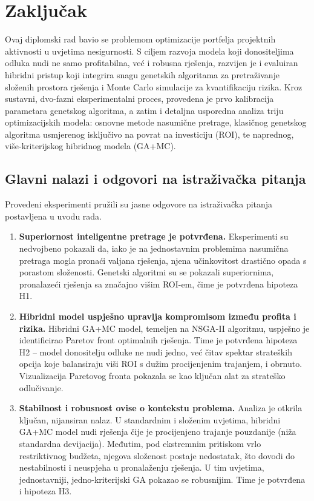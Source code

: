 \section{Zaključak}
Ovaj diplomski rad bavio se problemom optimizacije portfelja projektnih aktivnosti u uvjetima nesigurnosti. S ciljem razvoja modela koji donositeljima odluka nudi ne samo profitabilna, već i robusna rješenja, razvijen je i evaluiran hibridni pristup koji integrira snagu genetskih algoritama za pretraživanje složenih prostora rješenja i Monte Carlo simulacije za kvantifikaciju rizika.
Kroz sustavni, dvo-fazni eksperimentalni proces, provedena je prvo kalibracija parametara genetskog algoritma, a zatim i detaljna usporedna analiza triju optimizacijskih modela: osnovne metode nasumične pretrage, klasičnog genetskog algoritma usmjerenog isključivo na povrat na investiciju (ROI), te naprednog, više-kriterijskog hibridnog modela (GA+MC).

\subsection{Glavni nalazi i odgovori na istraživačka pitanja}
Provedeni eksperimenti pružili su jasne odgovore na istraživačka pitanja postavljena u uvodu rada.
\begin{enumerate}
    \item \textbf{Superiornost inteligentne pretrage je potvrđena.} Eksperimenti su nedvojbeno pokazali da, iako je na jednostavnim problemima nasumična pretraga mogla pronaći valjana rješenja, njena učinkovitost drastično opada s porastom složenosti. Genetski algoritmi su se pokazali superiornima, pronalazeći rješenja sa značajno višim ROI-em, čime je potvrđena hipoteza H1.
    \item \textbf{Hibridni model uspješno upravlja kompromisom između profita i rizika.} Hibridni GA+MC model, temeljen na NSGA-II algoritmu, uspješno je identificirao Paretov front optimalnih rješenja. Time je potvrđena hipoteza H2 – model donositelju odluke ne nudi jedno, već čitav spektar strateških opcija koje balansiraju viši ROI s dužim procijenjenim trajanjem, i obrnuto. Vizualizacija Paretovog fronta pokazala se kao ključan alat za strateško odlučivanje.
    \item \textbf{Stabilnost i robusnost ovise o kontekstu problema.} Analiza je otkrila ključan, nijansiran nalaz. U standardnim i složenim uvjetima, hibridni GA+MC model nudi rješenja čije je procijenjeno trajanje pouzdanije (niža standardna devijacija). Međutim, pod ekstremnim pritiskom vrlo restriktivnog budžeta, njegova složenost postaje nedostatak, što dovodi do nestabilnosti i neuspjeha u pronalaženju rješenja. U tim uvjetima, jednostavniji, jedno-kriterijski GA pokazao se robusnijim. Time je potvrđena i hipoteza H3.
\end{enumerate}

